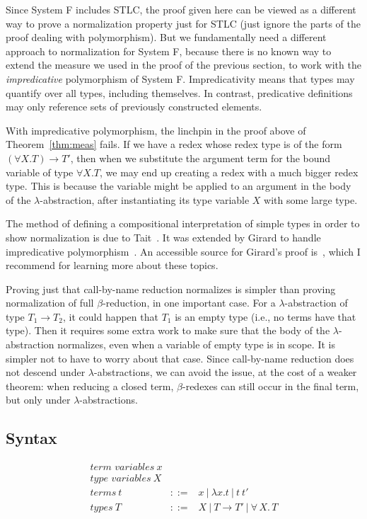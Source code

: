 \documentclass{article}
\begin{document}
Since System F includes STLC, the proof given here can be viewed as a
different way to prove a normalization property just for STLC (just
ignore the parts of the proof dealing with polymorphism).  But we
fundamentally need a different approach to normalization for System F,
because there is no known way to extend the measure we used in the
proof of the previous section, to work with the \emph{impredicative} polymorphism
of System F.  Impredicativity means that types may quantify over all types,
including themselves.  In contrast, predicative definitions may only
reference sets of previously constructed elements.

With impredicative polymorphism, the linchpin in the proof above of
Theorem~\ref{thm:meas} fails.  If we have a redex whose redex type is
of the form $(\forall X.T) \to T'$, then when we substitute the
argument term for the bound variable of type $\forall X.T$, we may end
up creating a redex with a much bigger redex type.  This is because
the variable might be applied to an argument in the body of the
$\lambda$-abstraction, after instantiating its type variable $X$ with
some large type.

The method of defining a compositional interpretation of simple types in
order to show normalization is due to Tait~\cite{tait67}.  It was extended by Girard
to handle impredicative polymorphism~\cite{girard72}.  An accessible source
for Girard's proof is~\citet{girard1989}, which
I recommend for learning more about these topics.

Proving just that call-by-name reduction normalizes is simpler than
proving normalization of full $\beta$-reduction, in one important
case.  For a $\lambda$-abstraction of type $T_1 \to T_2$, it could
happen that $T_1$ is an empty type (i.e., no terms have that type).
Then it requires some extra work to make sure that the body of the
$\lambda$-abstraction normalizes, even when a variable of empty type
is in scope.  It is simpler not to have to worry about that case.
Since call-by-name reduction does not descend under
$\lambda$-abstractions, we can avoid the issue, at the cost of a
weaker theorem: when reducing a closed term, $\beta$-redexes can still
occur in the final term, but only under $\lambda$-abstractions.

\subsection{Syntax}
\label{sec:syntax}

\[
\begin{array}{lll}
\textit{term variables}\ x & \ & \ \\
\textit{type variables}\ X & \ & \ \\
\textit{terms}\ t & ::= & x \ |\ \lambda x .t\ |\ t\ t'\\
\textit{types}\ T & ::= & X\ |\ T \to T'\ |\ \forall\, X.\, T
\end{array}
\]
\end{document}
